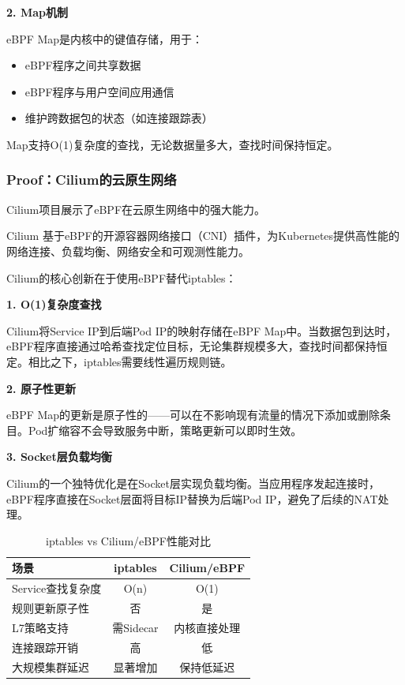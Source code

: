 \textbf{2. Map机制}

eBPF Map是内核中的键值存储，用于：
\begin{itemize}
    \item eBPF程序之间共享数据
    \item eBPF程序与用户空间应用通信
    \item 维护跨数据包的状态（如连接跟踪表）
\end{itemize}

Map支持O(1)复杂度的查找，无论数据量多大，查找时间保持恒定。

\subsubsection{Proof：Cilium的云原生网络}

Cilium项目展示了eBPF在云原生网络中的强大能力。

\begin{definition}{Cilium}
基于eBPF的开源容器网络接口（CNI）插件，为Kubernetes提供高性能的网络连接、负载均衡、网络安全和可观测性能力。
\end{definition}

Cilium的核心创新在于使用eBPF替代iptables：

\textbf{1. O(1)复杂度查找}

Cilium将Service IP到后端Pod IP的映射存储在eBPF Map中。当数据包到达时，eBPF程序直接通过哈希查找定位目标，无论集群规模多大，查找时间都保持恒定。相比之下，iptables需要线性遍历规则链。

\textbf{2. 原子性更新}

eBPF Map的更新是原子性的——可以在不影响现有流量的情况下添加或删除条目。Pod扩缩容不会导致服务中断，策略更新可以即时生效。

\textbf{3. Socket层负载均衡}

Cilium的一个独特优化是在Socket层实现负载均衡。当应用程序发起连接时，eBPF程序直接在Socket层面将目标IP替换为后端Pod IP，避免了后续的NAT处理。

\begin{table}[h]
\centering
\caption{iptables vs Cilium/eBPF性能对比}
\begin{tabular}{lcc}
\toprule
\textbf{场景} & \textbf{iptables} & \textbf{Cilium/eBPF} \\
\midrule
Service查找复杂度 & O(n) & O(1) \\
规则更新原子性 & 否 & 是 \\
L7策略支持 & 需Sidecar & 内核直接处理 \\
连接跟踪开销 & 高 & 低 \\
大规模集群延迟 & 显著增加 & 保持低延迟 \\
\bottomrule
\end{tabular}
\end{table}

